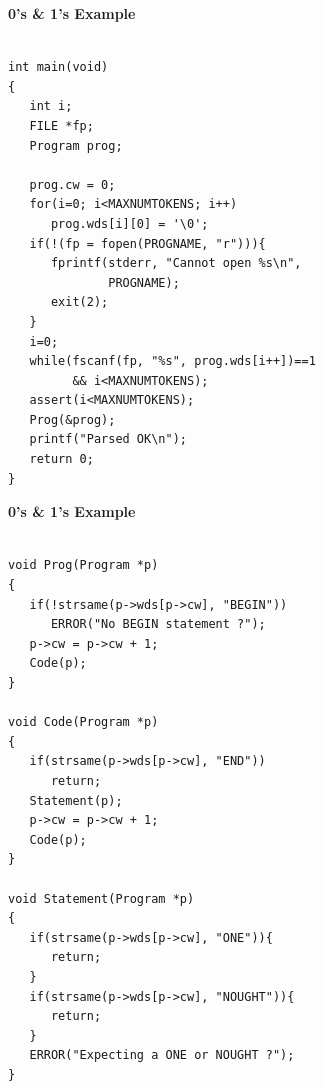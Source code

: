 \newpage
{\samepage
\begin{center}
{\Large{\bf 0's \& 1's Example}}
\end{center}
\begin{verbatim}

int main(void)
{
   int i;
   FILE *fp;
   Program prog;

   prog.cw = 0;
   for(i=0; i<MAXNUMTOKENS; i++)
      prog.wds[i][0] = '\0';
   if(!(fp = fopen(PROGNAME, "r"))){
      fprintf(stderr, "Cannot open %s\n",
              PROGNAME);
      exit(2);
   }
   i=0;
   while(fscanf(fp, "%s", prog.wds[i++])==1
         && i<MAXNUMTOKENS);
   assert(i<MAXNUMTOKENS);
   Prog(&prog);
   printf("Parsed OK\n");
   return 0;
}
\end{verbatim}
}

\newpage
{\samepage
\begin{center}
{\Large{\bf 0's \& 1's Example}}
\end{center}
{\small
\begin{verbatim}

void Prog(Program *p)
{
   if(!strsame(p->wds[p->cw], "BEGIN"))
      ERROR("No BEGIN statement ?");
   p->cw = p->cw + 1;
   Code(p);
}

void Code(Program *p)
{
   if(strsame(p->wds[p->cw], "END"))
      return;
   Statement(p);
   p->cw = p->cw + 1;
   Code(p);
}

void Statement(Program *p)
{
   if(strsame(p->wds[p->cw], "ONE")){
      return;
   }
   if(strsame(p->wds[p->cw], "NOUGHT")){
      return;
   }
   ERROR("Expecting a ONE or NOUGHT ?");
}
\end{verbatim}
}}

